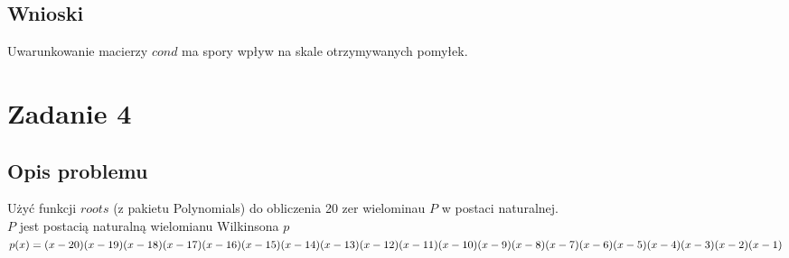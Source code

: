 \documentclass{article}
\begin{document}
\subsection*{Wnioski}
	Uwarunkowanie macierzy $cond$ ma spory wpływ na skale otrzymywanych pomyłek.\\
\section*{Zadanie 4}
\subsection*{Opis problemu}
	Użyć funkcji $roots$ (z pakietu Polynomials) do obliczenia 20 zer wielominau $P$ w postaci naturalnej. \\
	$P$ jest postacią naturalną wielomianu Wilkinsona $p$ \\
	$p(x) = (x - 20)(x - 19)(x - 18)(x - 17)(x - 16)(x - 15) \\
			(x - 14)(x - 13)(x - 12)(x - 11)(x - 10)(x - 9) \\
			(x - 8)(x - 7)(x - 6)(x - 5)(x - 4)(x - 3)(x - 2)(x - 1)$
\end{document}
